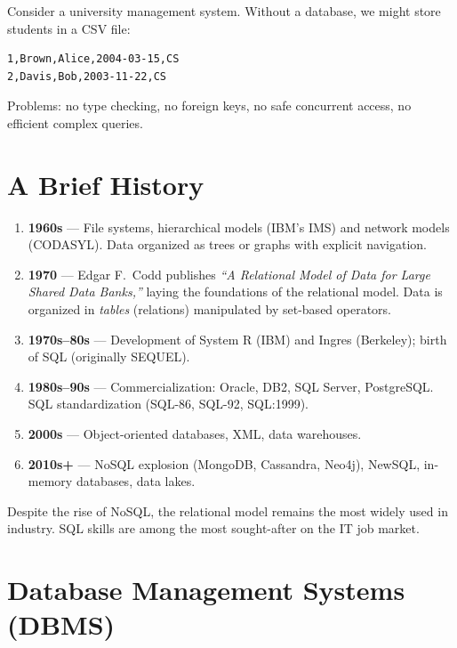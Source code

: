 \begin{example}
Consider a university management system. Without a database, we might store
students in a CSV file:
\begin{verbatim}
1,Brown,Alice,2004-03-15,CS
2,Davis,Bob,2003-11-22,CS
\end{verbatim}
Problems: no type checking, no foreign keys, no safe concurrent access,
no efficient complex queries.
\end{example}

\section{A Brief History}

\begin{enumerate}
    \item \textbf{1960s} --- File systems, hierarchical models (IBM's IMS) and
          network models (CODASYL). Data organized as trees or graphs with
          explicit navigation.
    \item \textbf{1970} --- Edgar F.~Codd publishes \emph{``A Relational Model of Data
          for Large Shared Data Banks,''} laying the foundations of the relational
          model. Data is organized in \emph{tables} (relations) manipulated by
          set-based operators.
    \item \textbf{1970s--80s} --- Development of System R (IBM) and Ingres (Berkeley);
          birth of SQL (originally SEQUEL).
    \item \textbf{1980s--90s} --- Commercialization: Oracle, DB2, SQL Server,
          PostgreSQL. SQL standardization (SQL-86, SQL-92, SQL:1999).
    \item \textbf{2000s} --- Object-oriented databases, XML, data warehouses.
    \item \textbf{2010s+} --- NoSQL explosion (MongoDB, Cassandra, Neo4j),
          NewSQL, in-memory databases, data lakes.
\end{enumerate}

\begin{remark}
Despite the rise of NoSQL, the relational model remains the most widely used
in industry. SQL skills are among the most sought-after on the IT job market.
\end{remark}

\section{Database Management Systems (DBMS)}

